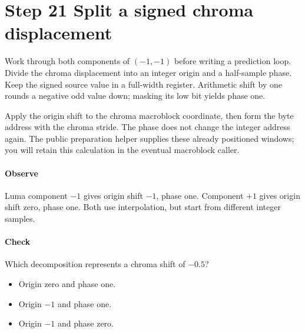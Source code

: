 \section{Step 21 Split a signed chroma displacement}\label{h263-prediction-s01}
Work through both components of $(-1,-1)$ before writing a prediction loop.
Divide the chroma displacement into an integer origin and a half-sample phase.
Keep the signed source value in a full-width register. Arithmetic shift by one
rounds a negative odd value down; masking its low bit yields phase one.

Apply the origin shift to the chroma macroblock coordinate, then form the byte
address with the chroma stride. The phase does not change the integer address
again. The public preparation helper supplies these already positioned windows;
you will retain this calculation in the eventual macroblock caller.

\paragraph{Observe} Luma component $-1$ gives origin shift $-1$, phase one.
Component $+1$ gives origin shift zero, phase one. Both use interpolation, but
start from different integer samples.
\paragraph{Check} Which decomposition represents a chroma shift of $-0.5$?
\begin{itemize}
  \item[A.] Origin zero and phase one.
  \item[B.] Origin $-1$ and phase one.
  \item[C.] Origin $-1$ and phase zero.
\end{itemize}
